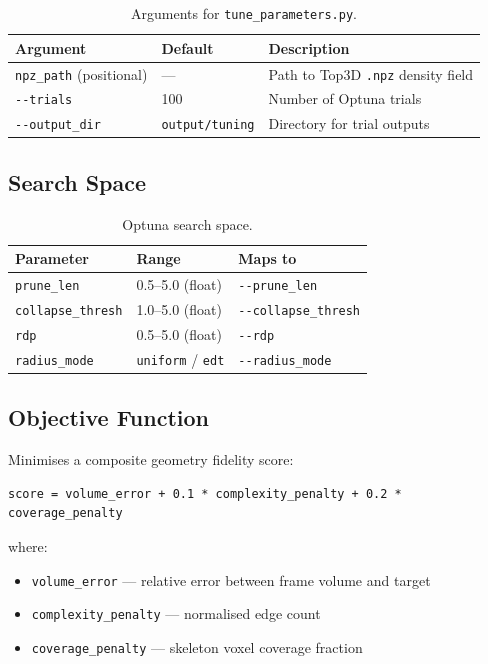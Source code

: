 \documentclass[a4paper, 11pt, openany]{report}
\begin{document}
\begin{table}[htbp]
\caption{Arguments for \texttt{tune\_parameters.py}.}
\label{tab:cli-tune-args}
\centering
\begin{tabularx}{\textwidth}{llX}
\toprule
Argument & Default & Description \\
\midrule
\texttt{npz\_path} (positional) & --- & Path to Top3D \texttt{.npz} density field \\
\texttt{-{}-trials} & 100 & Number of Optuna trials \\
\texttt{-{}-output\_dir} & \texttt{output/tuning} & Directory for trial outputs \\
\bottomrule
\end{tabularx}
\end{table}

\subsection{Search Space}

\begin{table}[htbp]
\caption{Optuna search space.}
\label{tab:search-space}
\centering
\begin{tabularx}{\textwidth}{llX}
\toprule
Parameter & Range & Maps to \\
\midrule
\texttt{prune\_len} & 0.5--5.0 (float) & \texttt{-{}-prune\_len} \\
\texttt{collapse\_thresh} & 1.0--5.0 (float) & \texttt{-{}-collapse\_thresh} \\
\texttt{rdp} & 0.5--5.0 (float) & \texttt{-{}-rdp} \\
\texttt{radius\_mode} & \texttt{uniform} / \texttt{edt} & \texttt{-{}-radius\_mode} \\
\bottomrule
\end{tabularx}
\end{table}

\subsection{Objective Function}

Minimises a composite geometry fidelity score:

\begin{lstlisting}[style=textstyle]
score = volume_error + 0.1 * complexity_penalty + 0.2 * coverage_penalty
\end{lstlisting}

where:
\begin{itemize}[nosep]
    \item \texttt{volume\_error} --- relative error between frame volume and target
    \item \texttt{complexity\_penalty} --- normalised edge count
    \item \texttt{coverage\_penalty} --- skeleton voxel coverage fraction
\end{itemize}
\end{document}
